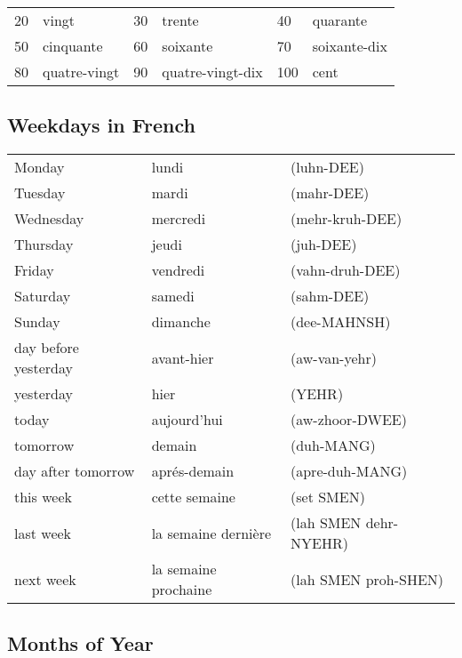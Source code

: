 \begin{tabular}{| l | l | l | l | l | l |}
\hline
20  & vingt         & 30  & trente          & 40  & quarante\\
50  & cinquante     & 60  & soixante        & 70  & soixante-dix\\
80  & quatre-vingt  & 90  & quatre-vingt-dix& 100 & cent\\
\hline
\end{tabular}

\subsection{Weekdays in French}

\begin{tabular}{| l | l | l |}
\hline
Monday    & lundi     & (luhn-DEE)      \\
Tuesday   & mardi     & (mahr-DEE)      \\
Wednesday & mercredi  & (mehr-kruh-DEE) \\
Thursday  & jeudi     & (juh-DEE)       \\
Friday    & vendredi  & (vahn-druh-DEE) \\
Saturday  & samedi    & (sahm-DEE)      \\
Sunday    & dimanche  & (dee-MAHNSH)    \\
\hline
\hline
day before yesterday & avant-hier & (aw-van-yehr) \\
yesterday & hier        & (YEHR)          \\
today     & aujourd'hui & (aw-zhoor-DWEE) \\
tomorrow  & demain      & (duh-MANG)    \\
day after tomorrow & apr\'{e}s-demain & (apre-duh-MANG) \\
this week & cette semaine & (set SMEN)  \\
last week & la semaine dernière   & (lah SMEN dehr-NYEHR)\\
next week & la semaine prochaine  & (lah SMEN proh-SHEN)  \\
\hline
\end{tabular}

\subsection{Months of Year}

